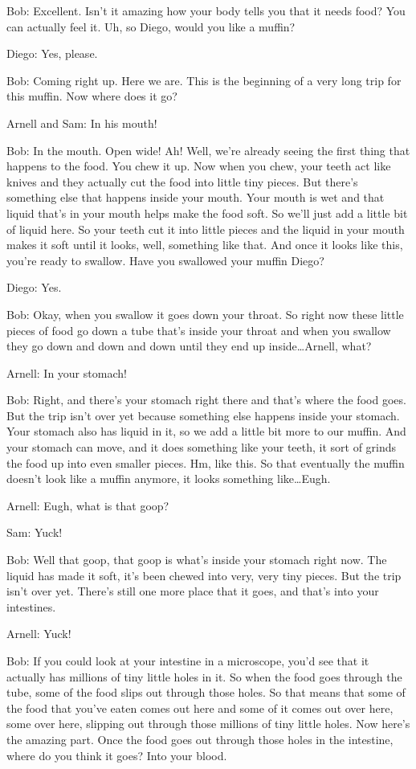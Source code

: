 Bob: Excellent. Isn't it amazing how your body tells you that it needs food? You can actually feel it. Uh, so Diego, would you like a muffin?

Diego: Yes, please.

Bob: Coming right up. Here we are. This is the beginning of a very long trip for this muffin. Now where does it go?

Arnell and Sam: In his mouth!

Bob: In the mouth. Open wide! Ah! Well, we're already seeing the first thing that happens to the food. You chew it up. Now when you chew, your teeth act like knives and they actually cut the food into little tiny pieces. But there's something else that happens inside your mouth. Your mouth is wet and that liquid that's in your mouth helps make the food soft. So we'll just add a little bit of liquid here. So your teeth cut it into little pieces and the liquid in your mouth makes it soft until it looks, well, something like that. And once it looks like this, you're ready to swallow. Have you swallowed your muffin Diego?

Diego: Yes.

Bob: Okay, when you swallow it goes down your throat. So right now these little pieces of food go down a tube that's inside your throat and when you swallow they go down and down and down until they end up inside\dots Arnell, what?

Arnell: In your stomach!

Bob: Right, and there's your stomach right there and that's where the food goes. But the trip isn't over yet because something else happens inside your stomach. Your stomach also has liquid in it, so we add a little bit more to our muffin. And your stomach can move, and it does something like your teeth, it sort of grinds the food up into even smaller pieces. Hm, like this. So that eventually the muffin doesn't look like a muffin anymore, it looks something like\dots Eugh.

Arnell: Eugh, what is that goop?

Sam: Yuck!

Bob: Well that goop, that goop is what's inside your stomach right now. The liquid has made it soft, it's been chewed into very, very tiny pieces. But the trip isn't over yet. There's still one more place that it goes, and that's into your intestines.

Arnell: Yuck!

Bob: If you could look at your intestine in a microscope, you'd see that it actually has millions of tiny little holes in it. So when the food goes through the tube, some of the food slips out through those holes. So that means that some of the food that you've eaten comes out here and some of it comes out over here, some over here, slipping out through those millions of tiny little holes. Now here's the amazing part. Once the food goes out through those holes in the intestine, where do you think it goes? Into your blood.

